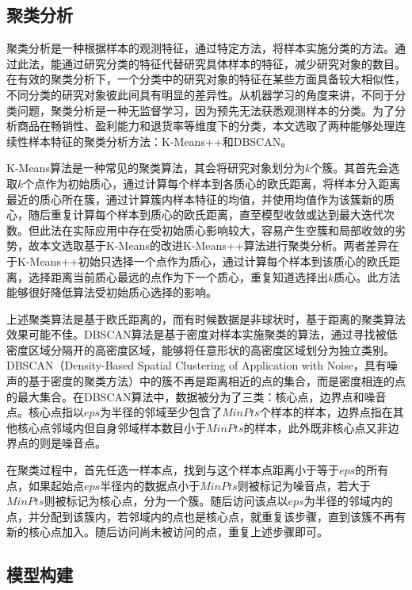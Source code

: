 \documentclass[lang=cn,11pt,a4paper,cite=authoryear]{elegantpaper}
\begin{document}
\subsection{聚类分析}

聚类分析是一种根据样本的观测特征，通过特定方法，将样本实施分类的方法。通过此法，能通过研究分类的特征代替研究具体样本的特征，减少研究对象的数目。在有效的聚类分析下，一个分类中的研究对象的特征在某些方面具备较大相似性，不同分类的研究对象彼此间具有明显的差异性。从机器学习的角度来讲，不同于分类问题，聚类分析是一种无监督学习，因为预先无法获悉观测样本的分类。为了分析商品在畅销性、盈利能力和退货率等维度下的分类，本文选取了两种能够处理连续性样本特征的聚类分析方法：K-Means++和DBSCAN。

K-Means算法是一种常见的聚类算法，其会将研究对象划分为$k$个簇。其首先会选取$k$个点作为初始质心，通过计算每个样本到各质心的欧氏距离，将样本分入距离最近的质心所在簇，通过计算簇内样本特征的均值，并使用均值作为该簇新的质心，随后重复计算每个样本到质心的欧氏距离，直至模型收敛或达到最大迭代次数。但此法在实际应用中存在受初始质心影响较大，容易产生空簇和局部收敛的劣势，故本文选取基于K-Means的改进K-Means++算法进行聚类分析。两者差异在于K-Means++初始只选择一个点作为质心，通过计算每个样本到该质心的欧氏距离，选择距离当前质心最远的点作为下一个质心，重复知道选择出$k$质心。此方法能够很好降低算法受初始质心选择的影响。

上述聚类算法是基于欧氏距离的，而有时候数据是非球状时，基于距离的聚类算法效果可能不佳。DBSCAN算法是基于密度对样本实施聚类的算法，通过寻找被低密度区域分隔开的高密度区域，能够将任意形状的高密度区域划分为独立类别。DBSCAN（Density-Based Spatial Clustering of Application with Noise，具有噪声的基于密度的聚类方法）中的簇不再是距离相近的点的集合，而是密度相连的点的最大集合。在DBSCAN算法中，数据被分为了三类：核心点，边界点和噪音点。核心点指以$eps$为半径的邻域至少包含了$MinPts$个样本的样本，边界点指在其他核心点邻域内但自身邻域样本数目小于$MinPts$的样本，此外既非核心点又非边界点的则是噪音点。

在聚类过程中，首先任选一样本点，找到与这个样本点距离小于等于$eps$的所有点，如果起始点$eps$半径内的数据点小于$MinPts$则被标记为噪音点，若大于$MinPts$则被标记为核心点，分为一个簇。随后访问该点以$eps$为半径的邻域内的点，并分配到该簇内，若邻域内的点也是核心点，就重复该步骤，直到该簇不再有新的核心点加入。随后访问尚未被访问的点，重复上述步骤即可。

\subsection{模型构建}
\end{document}
